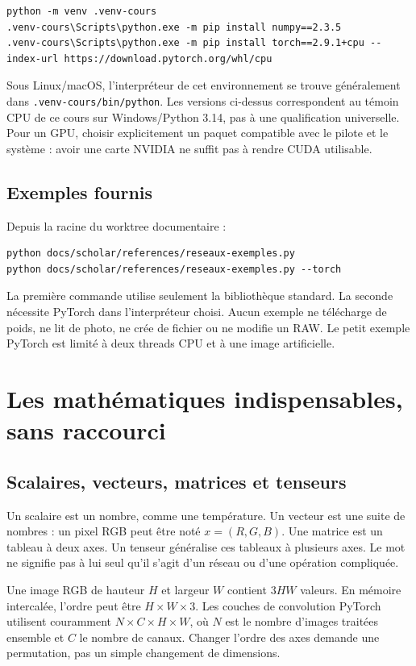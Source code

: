 \documentclass[12pt,a4paper,oneside]{report}
\begin{document}
\begin{lstlisting}[language={}]
python -m venv .venv-cours
.venv-cours\Scripts\python.exe -m pip install numpy==2.3.5
.venv-cours\Scripts\python.exe -m pip install torch==2.9.1+cpu --index-url https://download.pytorch.org/whl/cpu
\end{lstlisting}

Sous Linux/macOS, l'interpréteur de cet environnement se trouve généralement
dans \texttt{.venv-cours/bin/python}. Les versions ci-dessus correspondent au
témoin CPU de ce cours sur Windows/Python 3.14, pas à une qualification universelle.
Pour un GPU, choisir explicitement un paquet compatible avec le pilote et le
système : avoir une carte NVIDIA ne suffit pas à rendre CUDA utilisable.

\section{Exemples fournis}

Depuis la racine du worktree documentaire :
\begin{lstlisting}[language={}]
python docs/scholar/references/reseaux-exemples.py
python docs/scholar/references/reseaux-exemples.py --torch
\end{lstlisting}

La première commande utilise seulement la bibliothèque standard. La seconde
nécessite PyTorch dans l'interpréteur choisi. Aucun exemple ne télécharge de
poids, ne lit de photo, ne crée de fichier ou ne modifie un RAW. Le petit exemple
PyTorch est limité à deux threads CPU et à une image artificielle.

\chapter{Les mathématiques indispensables, sans raccourci}

\section{Scalaires, vecteurs, matrices et tenseurs}

Un scalaire est un nombre, comme une température. Un vecteur est une suite de
nombres : un pixel RGB peut être noté $x=(R,G,B)$. Une matrice est un tableau à
deux axes. Un tenseur généralise ces tableaux à plusieurs axes. Le mot ne signifie
pas à lui seul qu'il s'agit d'un réseau ou d'une opération compliquée.

Une image RGB de hauteur $H$ et largeur $W$ contient $3HW$ valeurs. En mémoire
intercalée, l'ordre peut être $H\times W\times3$. Les couches de convolution
PyTorch utilisent couramment $N\times C\times H\times W$, où $N$ est le nombre
d'images traitées ensemble et $C$ le nombre de canaux. Changer l'ordre des axes
demande une permutation, pas un simple changement de dimensions.
\end{document}
